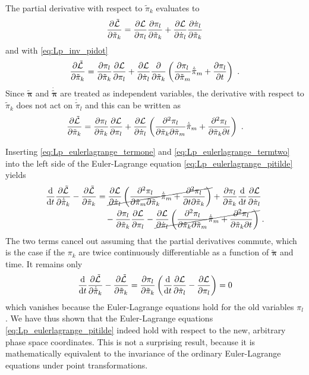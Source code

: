 \documentclass{scrartcl}
\renewcommand{\vec}[1]{\boldsymbol{#1}}
\newcommand{\pid}{\dot{\pi}}
\newcommand{\pit}{\tilde{\pi}}
\newcommand{\pitd}{\dot{\tilde{\pi}}}
\newcommand{\pivt}{\tilde{\vec{\pi}}}
\newcommand{\pivtd}{\dot{\tilde{\vec{\pi}}}}
\newcommand{\PSL}{\mathcal{L}}
\begin{document}
The partial derivative with respect to $\pit_k$ evaluates to
\begin{equation*}
\pdv{\tilde{\PSL}}{\pit_k} = \pdv{\PSL}{\pi_l}\pdv{\pi_l}{\pit_k} + \pdv{\PSL}{\pid_l}\pdv{\pid_l}{\pit_k}
\end{equation*}
and with \eqref{eq:Lp_inv_pidot}
\begin{equation*}
\pdv{\tilde{\PSL}}{\pit_k} = \pdv{\pi_l}{\pit_k}\pdv{\PSL}{\pi_l} + \pdv{\PSL}{\pid_l}\pdv{\pit_k}\left(\pdv{\pi_l}{\pit_m}\pitd_m + \pdv{\pi_l}{t}\right) \ .
\end{equation*}
Since $\pivt$ and $\pivtd$ are treated as independent variables, the derivative with respect to $\pit_k$ does not act on $\pitd_l$ and this can be written as
\begin{equation}
\pdv{\tilde{\PSL}}{\pit_k} = \pdv{\pi_l}{\pit_k}\pdv{\PSL}{\pi_l} + \pdv{\PSL}{\pid_l}\left(\pdv[2]{\pi_l}{\pit_k}{\pit_m}\pitd_m + \pdv[2]{\pi_l}{\pit_k}{t}\right) \ .
\label{eq:Lp_eulerlagrange_termtwo}
\end{equation}

Inserting \eqref{eq:Lp_eulerlagrange_termone} and \eqref{eq:Lp_eulerlagrange_termtwo} into the left side of the Euler-Lagrange equation \eqref{eq:Lp_eulerlagrange_pitilde} yields
\begin{align*}
\dv{t} \pdv{\tilde{\PSL}}{\pitd_k} - \pdv{\tilde{\PSL}}{\pit_k} &= \cancel{\pdv{\PSL}{\pid_l}\left(\pdv[2]{\pi_l}{\pit_m}{\pit_k}\pitd_m + \pdv[2]{\pi_l}{t}{\pit_k}\right)} + \pdv{\pi_l}{\pit_k}\dv{t}\pdv{\PSL}{\pid_l} \\
&\quad - \pdv{\pi_l}{\pit_k}\pdv{\PSL}{\pi_l} - \cancel{\pdv{\PSL}{\pid_l}\left(\pdv[2]{\pi_l}{\pit_k}{\pit_m}\pitd_m + \pdv[2]{\pi_l}{\pit_k}{t}\right)} \ .
\end{align*}
The two terms cancel out assuming that the partial derivatives commute, which is the case if the $\pi_k$ are twice continuously differentiable as a function of $\pivt$ and time. It remains only
\begin{equation*}
\dv{t} \pdv{\tilde{\PSL}}{\pitd_k} - \pdv{\tilde{\PSL}}{\pit_k} = \pdv{\pi_l}{\pit_k}\left(\dv{t}\pdv{\PSL}{\pid_l}  - \pdv{\PSL}{\pi_l}\right) = 0
\end{equation*}
which vanishes because the Euler-Lagrange equations hold for the old variables $\pi_l$. We have thus shown that the Euler-Lagrange equations \eqref{eq:Lp_eulerlagrange_pitilde} indeed hold with respect to the new, arbitrary phase space coordinates. This is not a surprising result, because it is mathematically equivalent to the invariance of the ordinary Euler-Lagrange equations under point transformations.
\end{document}
